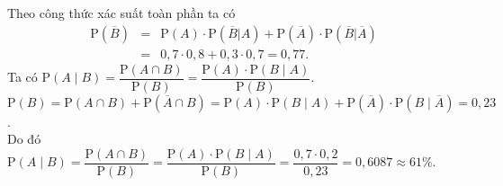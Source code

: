\begin{ex}
{\begin{itemchoice}
		\itemch Theo công thức xác suất toàn phần ta có
		\begin{eqnarray*}
			\mathrm{P}(\overline{B}) &=& \mathrm{P}(A) \cdot \mathrm{P}(\overline{B}|A) +\mathrm{P}\left(\overline{A}\right) \cdot  \mathrm{P}\left(\overline{B}|\overline{A}\right)\\
			&=& 0{,}7 \cdot 0{,}8+ 0{,}3\cdot 0{,}7= 0{,}77.
		\end{eqnarray*}
		\itemch Ta có $ \mathrm{P}(A\mid B)=\dfrac{ \mathrm{P}(A \cap B)}{ \mathrm{P}(B)}=\dfrac{ \mathrm{P}(A)\cdot  \mathrm{P}(B \mid A)}{ \mathrm{P}(B)}$.\\
		$ \mathrm{P}(B)=\mathrm{P}(A \cap B)+\mathrm{P}(\overline{A} \cap B)=\mathrm{P}(A)\cdot\mathrm{P}(B\mid A)+\mathrm{P}(\overline{A})\cdot\mathrm{P}(B\mid \overline{A})=0{,}23$.\\
		Do đó $ \mathrm{P}(A\mid B)=\dfrac{ \mathrm{P}(A \cap B)}{ \mathrm{P}(B)}=\dfrac{ \mathrm{P}(A)\cdot  \mathrm{P}(B \mid A)}{ \mathrm{P}(B)}=\dfrac{0{,}7 \cdot 0{,}2}{0{,}23}=0{,}6087\approx 61\%$.
	\end{itemchoice}
	}
\end{ex}

%

